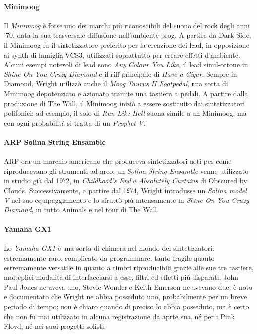 \documentclass[class=book, crop=false, oneside, 12pt]{standalone}
\begin{document}
    \paragraph{Minimoog}
    Il \emph{Minimoog} è forse uno dei marchi più riconoscibili del suono del rock degli anni '70, data la sua trasversale diffusione nell'ambiente prog. A partire da Dark Side, il Minimoog fu il sintetizzatore preferito per la creazione dei lead, in opposizione ai synth di famiglia VCS3, utilizzati soprattutto per creare effetti d'ambiente. Alcuni esempi notevoli di lead sono \emph{Any Colour You Like}, il lead simil-ottone in \emph{Shine On You Crazy Diamond} e il riff principale di \emph{Have a Cigar}. Sempre in Diamond, Wright utilizzò anche il \emph{Moog Taurus II Footpedal}, una sorta di Minimoog depotenziato  e azionato tramite una tastiera a pedali. A partire dalla produzione di The Wall, il Minimoog iniziò a essere sostituito dai sintetizzatori polifonici: ad esempio, il solo di \emph{Run Like Hell} suona simile a un Minimoog, ma con ogni probabilità si tratta di un \emph{Prophet V}.

    \paragraph{ARP Solina String Ensamble}
    ARP era un marchio americano che produceva sintetizzatori noti per come riproducevano gli strumenti ad arco; un \emph{Solina String Ensamble} venne utilizzato in studio già dal 1972, in \emph{Childhood's End} e \emph{Absolutely Curtains} di Obscured by Clouds. Successivamente, a partire dal 1974, Wright introdusse un \emph{Solina model V} nel suo equipaggiamento e lo sfruttò più intensamente in \emph{Shine On You Crazy Diamond}, in tutto Animals e nel tour di The Wall.

    \paragraph{Yamaha GX1}
    Lo \emph{Yamaha GX1} è una sorta di chimera nel mondo dei sintetizzatori: estremamente raro, complicato da programmare, tanto fragile quanto estremamente versatile in quanto a timbri riproducibili grazie alle sue tre tastiere, molteplici modalità di interfacciarsi a esse, filtri ed effetti più disparati. John Paul Jones ne aveva uno, Stevie Wonder e Keith Emerson ne avevano due; è noto e documentato che Wright ne abbia posseduto uno, probabilmente per un breve periodo di tempo; non è chiaro quando di preciso lo abbia posseduto, ma è certo che non fu mai utilizzato in alcuna registrazione da aprte sua, né per i Pink  Floyd, né nei suoi progetti solisti.
\end{document}
